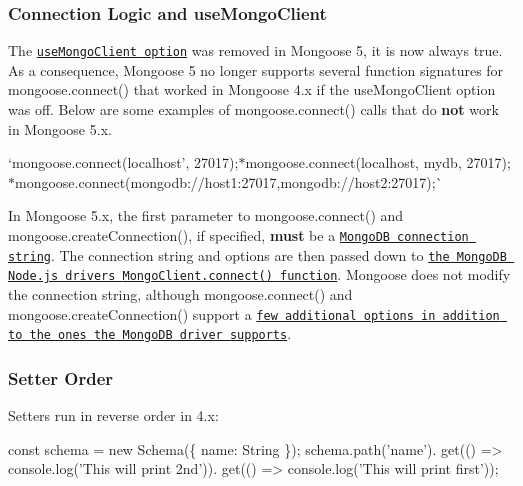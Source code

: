 \subsubsection*{Connection Logic and {\ttfamily use\+Mongo\+Client}}

The \href{http://mongoosejs.com/docs/4.x/docs/connections.html#use-mongo-client}{\tt {\ttfamily use\+Mongo\+Client} option} was removed in Mongoose 5, it is now always {\ttfamily true}. As a consequence, Mongoose 5 no longer supports several function signatures for {\ttfamily mongoose.\+connect()} that worked in Mongoose 4.\+x if the {\ttfamily use\+Mongo\+Client} option was off. Below are some examples of {\ttfamily mongoose.\+connect()} calls that do {\bfseries not} work in Mongoose 5.\+x.


\begin{DoxyItemize}
\item `mongoose.\+connect(\textquotesingle{}localhost', 27017);{\ttfamily  $\ast$}mongoose.\+connect(\textquotesingle{}localhost\textquotesingle{}, \textquotesingle{}mydb\textquotesingle{}, 27017);{\ttfamily  $\ast$}mongoose.\+connect(\textquotesingle{}mongodb\+://host1\+:27017,mongodb\+://host2\+:27017\textquotesingle{});\`{}
\end{DoxyItemize}

In Mongoose 5.\+x, the first parameter to {\ttfamily mongoose.\+connect()} and {\ttfamily mongoose.\+create\+Connection()}, if specified, {\bfseries must} be a \href{https://docs.mongodb.com/manual/reference/connection-string/}{\tt Mongo\+DB connection string}. The connection string and options are then passed down to \href{http://mongodb.github.io/node-mongodb-native/3.0/api/MongoClient.html#.connect}{\tt the Mongo\+DB Node.\+js driver\textquotesingle{}s {\ttfamily Mongo\+Client.\+connect()} function}. Mongoose does not modify the connection string, although {\ttfamily mongoose.\+connect()} and {\ttfamily mongoose.\+create\+Connection()} support a \href{http://mongoosejs.com/docs/connections.html#options}{\tt few additional options in addition to the ones the Mongo\+DB driver supports}.

\subsubsection*{Setter Order}

Setters run in reverse order in 4.\+x\+:


\begin{DoxyCode}
const schema = new Schema(\{ name: String \});
schema.path('name').
  get(() => console.log('This will print 2nd')).
  get(() => console.log('This will print first'));
\end{DoxyCode}


